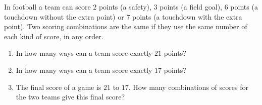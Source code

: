 In football a team can score $2$ points (a safety), $3$ points (a field goal), $6$ points (a touchdown without the extra point) or $7$ points (a touchdown with the extra point). Two scoring combinations are the same if they use the same number of each kind of score, in any order.
\begin{enumerate}
\item[(a)] In how many ways can a team score exactly $21$ points?
\item[(b)] In how many ways can a team score exactly $17$ points?
\item[(c)] The final score of a game is $21$ to $17$. How many combinations of scores for the two teams give this final score?
\end{enumerate}
